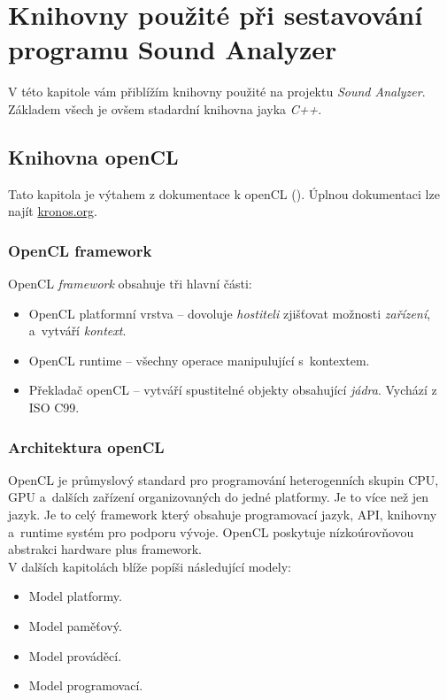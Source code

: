 \chapter{Knihovny použité při sestavování programu Sound Analyzer}
\label{kap:libraries}

V této kapitole vám přiblížím knihovny použité na projektu \emph{Sound Analyzer}.
Základem všech je ovšem stadardní knihovna jayka \emph{C++}.

\section{Knihovna openCL}
\label{kap:opencl}

Tato kapitola je výtahem z dokumentace k openCL (\cite{opencl}).
Úplnou dokumentaci lze najít \url{kronos.org}.

\subsection{OpenCL framework}

OpenCL \emph{framework} obsahuje tři hlavní části:

\begin{itemize}
\item OpenCL platformní vrstva -- dovoluje \emph{hostiteli} zjišťovat možnosti \emph{zařízení}, a~vytváří \emph{kontext}.
\item OpenCL runtime -- všechny operace manipulující s~kontextem.
\item Překladač openCL -- vytváří spustitelné objekty obsahující \emph{jádra}. Vychází z  ISO C99.
\end{itemize}

\subsection{Architektura openCL}

OpenCL je průmyslový standard pro programování heterogenních skupin CPU, GPU a~dalších zařízení organizovaných do jedné platformy. Je to více než jen jazyk.
Je to celý framework  který obsahuje programovací jazyk, API,
knihovny a~runtime systém pro podporu vývoje. OpenCL poskytuje nízkoúrovňovou
abstrakci hardware plus framework.
\\
V dalších kapitolách blíže popíši následující modely:
\begin{itemize}
\item Model platformy.
\item Model paměťový.
\item Model prováděcí.
\item Model programovací.
\end{itemize}

